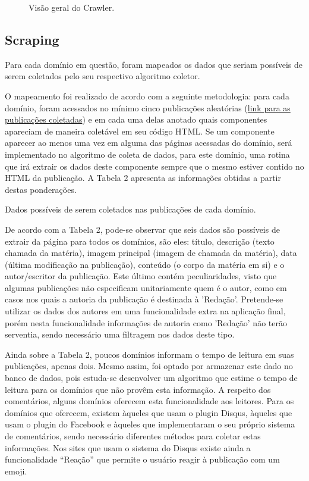 \begin{figure}[H]
				\centering

\caption{Visão geral do Crawler.}
\end{figure}

\subsection{Scraping}
Para cada domínio em questão, foram mapeados os dados que seriam possíveis de serem coletados pelo seu respectivo algoritmo coletor.
 
O mapeamento foi realizado de acordo com a seguinte metodologia: para cada domínio, foram acessados no mínimo cinco publicações aleatórias (\href{https://docs.google.com/spreadsheets/d/16GBvNhlEYIQu8gTSKxBf8nR-BqBWB0fvnNiLtWflXy8/edit#gid=1793937951}{link para as publicações coletadas}) e em cada uma delas anotado quais componentes apareciam de maneira coletável em seu código HTML. Se um componente aparecer ao menos uma vez em alguma das páginas acessadas do domínio, será implementado no algoritmo de coleta de dados, para este domínio, uma rotina que irá extrair os dados deste componente sempre que o mesmo estiver contido no HTML da publicação. A Tabela 2 apresenta as informações obtidas a partir destas ponderações.  

\begin{table}[H]
				\tiny
\noindent\makebox[\textwidth]{%
}
\caption{Dados possíveis de serem coletados nas publicações de cada domínio.}
\end{table}

De acordo com a Tabela 2, pode-se observar que seis dados são possíveis de extrair da página para todos os domínios, são eles: título, descrição (texto chamada da matéria), imagem principal (imagem de chamada da matéria), data (última modificação na publicação), conteúdo (o corpo da matéria em si) e o autor/escritor da publicação. Este último contém peculiaridades, visto que algumas publicações não especificam unitariamente quem é o autor, como em casos nos quais a autoria da publicação é destinada à 'Redação'. Pretende-se utilizar os dados dos autores em uma funcionalidade extra na aplicação final, porém nesta funcionalidade informações de autoria como 'Redação' não terão serventia, sendo necessário uma filtragem nos dados deste tipo.

Ainda sobre a Tabela 2, poucos domínios informam o tempo de leitura em suas publicações, apenas dois. Mesmo assim, foi optado por armazenar este dado no banco de dados, pois estuda-se desenvolver um algoritmo que estime o tempo de leitura para os domínios que não provêm esta informação. A respeito dos comentários, alguns domínios oferecem esta funcionalidade aos leitores. Para os domínios que oferecem, existem àqueles que usam o plugin Disqus, àqueles que usam o plugin do Facebook e àqueles que implementaram o seu próprio sistema de comentários, sendo necessário diferentes métodos para coletar estas informações. Nos sites que usam o sistema do Disqus existe ainda a funcionalidade “Reação” que permite o usuário reagir à publicação com um emoji.

